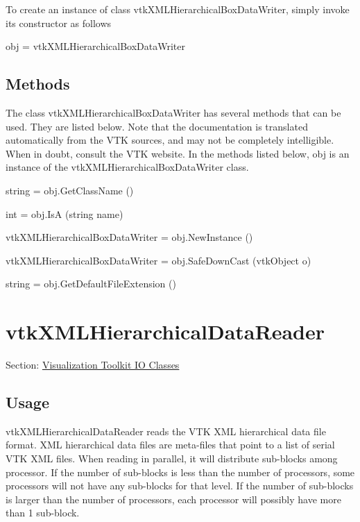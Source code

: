 To create an instance of class vtk\-X\-M\-L\-Hierarchical\-Box\-Data\-Writer, simply invoke its constructor as follows \begin{DoxyVerb}  obj = vtkXMLHierarchicalBoxDataWriter
\end{DoxyVerb}
 \hypertarget{vtkwidgets_vtkxyplotwidget_Methods}{}\subsection{Methods}\label{vtkwidgets_vtkxyplotwidget_Methods}
The class vtk\-X\-M\-L\-Hierarchical\-Box\-Data\-Writer has several methods that can be used. They are listed below. Note that the documentation is translated automatically from the V\-T\-K sources, and may not be completely intelligible. When in doubt, consult the V\-T\-K website. In the methods listed below, {\ttfamily obj} is an instance of the vtk\-X\-M\-L\-Hierarchical\-Box\-Data\-Writer class. 
\begin{DoxyItemize}
\item {\ttfamily string = obj.\-Get\-Class\-Name ()}  
\item {\ttfamily int = obj.\-Is\-A (string name)}  
\item {\ttfamily vtk\-X\-M\-L\-Hierarchical\-Box\-Data\-Writer = obj.\-New\-Instance ()}  
\item {\ttfamily vtk\-X\-M\-L\-Hierarchical\-Box\-Data\-Writer = obj.\-Safe\-Down\-Cast (vtk\-Object o)}  
\item {\ttfamily string = obj.\-Get\-Default\-File\-Extension ()}  
\end{DoxyItemize}\hypertarget{vtkio_vtkxmlhierarchicaldatareader}{}\section{vtk\-X\-M\-L\-Hierarchical\-Data\-Reader}\label{vtkio_vtkxmlhierarchicaldatareader}
Section\-: \hyperlink{sec_vtkio}{Visualization Toolkit I\-O Classes} \hypertarget{vtkwidgets_vtkxyplotwidget_Usage}{}\subsection{Usage}\label{vtkwidgets_vtkxyplotwidget_Usage}
vtk\-X\-M\-L\-Hierarchical\-Data\-Reader reads the V\-T\-K X\-M\-L hierarchical data file format. X\-M\-L hierarchical data files are meta-\/files that point to a list of serial V\-T\-K X\-M\-L files. When reading in parallel, it will distribute sub-\/blocks among processor. If the number of sub-\/blocks is less than the number of processors, some processors will not have any sub-\/blocks for that level. If the number of sub-\/blocks is larger than the number of processors, each processor will possibly have more than 1 sub-\/block.

